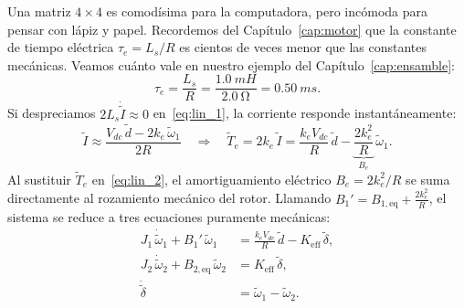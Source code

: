 \documentclass[11pt,a4paper,oneside]{book}
\begin{document}
Una matriz $4\times 4$ es comodísima para la computadora, pero incómoda para
pensar con lápiz y papel. Recordemos del Capítulo~\ref{cap:motor} que la
constante de tiempo eléctrica $\tau_e = L_s/R$ es cientos de veces menor que las
constantes mecánicas. Veamos cuánto vale en nuestro ejemplo del
Capítulo~\ref{cap:ensamble}:
\[
  \tau_e = \frac{L_s}{R} = \frac{\SI{1,0}{mH}}{\SI{2,0}{\ohm}} = \SI{0,50}{ms}.
\]
Si despreciamos $2L_s\dot{\tilde I} \approx 0$ en~\eqref{eq:lin_1}, la corriente
responde instantáneamente:
\begin{equation}
  \tilde I \approx \frac{V_{dc}\,\tilde d - 2k_e\,\tilde\omega_1}{2R}
  \quad\Longrightarrow\quad
  \tilde T_e = 2k_e\,\tilde I = \frac{k_e V_{dc}}{R}\,\tilde d - \underbrace{\frac{2k_e^2}{R}}_{B_e}\,\tilde\omega_1.
  \label{eq:cuasiestatica}
\end{equation}
Al sustituir $\tilde T_e$ en~\eqref{eq:lin_2}, el amortiguamiento eléctrico
$B_e = 2k_e^2/R$ se suma directamente al rozamiento mecánico del rotor. Llamando
$B_1' = B_{1,\text{eq}} + \frac{2k_e^2}{R}$, el sistema se reduce a tres
ecuaciones puramente mecánicas:
\begin{align*}
  J_1\,\dot{\tilde\omega}_1 + B_1'\,\tilde\omega_1 &= \frac{k_e V_{dc}}{R}\,\tilde d - K_{\text{eff}}\,\tilde\delta, \\
  J_2\,\dot{\tilde\omega}_2 + B_{2,\text{eq}}\,\tilde\omega_2 &= K_{\text{eff}}\,\tilde\delta, \\
  \dot{\tilde\delta} &= \tilde\omega_1 - \tilde\omega_2.
\end{align*}
\end{document}
